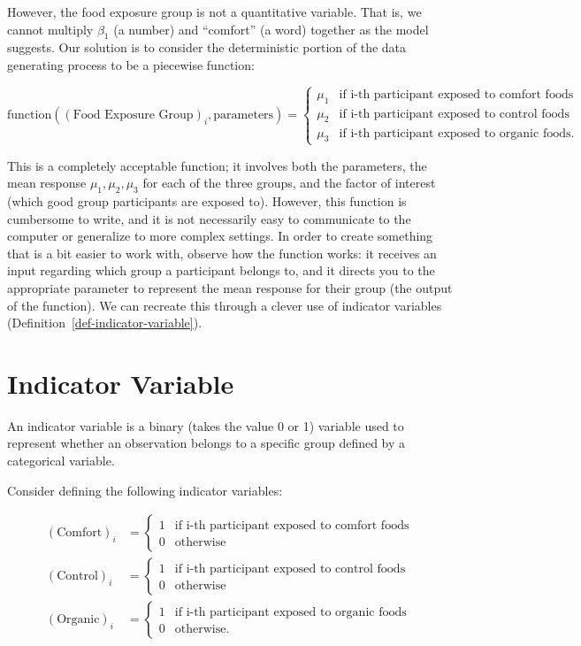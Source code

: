 \documentclass[
  letterpaper,
  DIV=11,
  numbers=noendperiod]{scrreprt}
\theoremstyle{plain}
\theoremstyle{definition}
\theoremstyle{definition}
\theoremstyle{remark}
\begin{document}
However, the food exposure group is not a quantitative variable. That
is, we cannot multiply \(\beta_1\) (a number) and ``comfort'' (a word)
together as the model suggests. Our solution is to consider the
deterministic portion of the data generating process to be a piecewise
function:

\[
\text{function}\left((\text{Food Exposure Group})_i, \text{parameters}\right) =
\begin{cases}
  \mu_1 & \text{if i-th participant exposed to comfort foods} \\
  \mu_2 & \text{if i-th participant exposed to control foods} \\
  \mu_3 & \text{if i-th participant exposed to organic foods.} 
\end{cases}
\]

This is a completely acceptable function; it involves both the
parameters, the mean response \(\mu_1, \mu_2, \mu_3\) for each of the
three groups, and the factor of interest (which good group participants
are exposed to). However, this function is cumbersome to write, and it
is not necessarily easy to communicate to the computer or generalize to
more complex settings. In order to create something that is a bit easier
to work with, observe how the function works: it receives an input
regarding which group a participant belongs to, and it directs you to
the appropriate parameter to represent the mean response for their group
(the output of the function). We can recreate this through a clever use
of indicator variables (Definition~\ref{def-indicator-variable}).

\section{Indicator Variable}\label{indicator-variable-1}

An indicator variable is a binary (takes the value 0 or 1) variable used
to represent whether an observation belongs to a specific group defined
by a categorical variable.

Consider defining the following indicator variables:

\[
\begin{aligned}
  (\text{Comfort})_i 
    &= \begin{cases} 1 & \text{if i-th participant exposed to comfort foods} \\ 0 & \text{otherwise} \end{cases} \\
  (\text{Control})_i 
    &= \begin{cases} 1 & \text{if i-th participant exposed to control foods} \\ 0 & \text{otherwise} \end{cases} \\
  (\text{Organic})_i 
    &= \begin{cases} 1 & \text{if i-th participant exposed to organic foods} \\ 0 & \text{otherwise}. \end{cases}
\end{aligned}
\]
\end{document}
